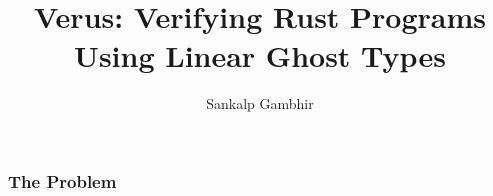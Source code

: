 \documentclass[
  aspectratio=1610, 
  xcolor={dvipsnames},
]{beamer}
\title{Verus: Verifying Rust Programs Using Linear Ghost Types}
\author{Sankalp Gambhir}
\begin{document}
\maketitle

\begin{frame}
  \frametitle{The Problem}

\end{frame}
\end{document}
